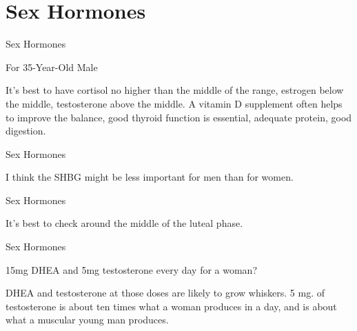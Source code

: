 \documentclass[11pt,oneside,openany,extrafontsizes]{memoir}
\begin{document}
\section{Sex Hormones}

\begin{standalonequote}{Sex Hormones}
    \begin{note}
        For 35-Year-Old Male
    \end{note}

    \begin{answer}
        It's best to have cortisol no higher than the middle of the range, estrogen below the middle, testosterone above the middle. A vitamin D supplement often helps to improve the balance, good thyroid function is essential, adequate protein, good digestion.
    \end{answer}
\end{standalonequote}

\begin{standalonequote}{Sex Hormones}

    \begin{answer}
        I think the SHBG might be less important for men than for women.
    \end{answer}
\end{standalonequote}

\begin{standalonequote}{Sex Hormones}

    \begin{answer}
        It's best to check around the middle of the luteal phase.
    \end{answer}
\end{standalonequote}

\begin{qaexchange}{Sex Hormones}

    \begin{question}
        15mg DHEA and 5mg testosterone every day for a woman?
    \end{question}

    \begin{answer}
        DHEA and testosterone at those doses are likely to grow whiskers. 5 mg. of testosterone is about ten times what a woman produces in a day, and is about what a muscular young man produces.
    \end{answer}
\end{qaexchange}
\end{document}
